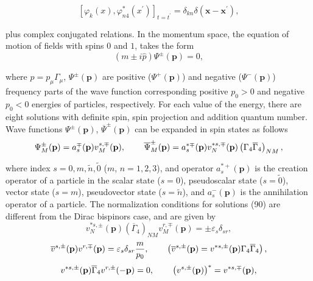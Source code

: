 \documentclass[a4paper,12pt]{article}
\begin{document}
\[
\left[ \varphi _k(x),\varphi _{n4}^{*}(x^{\prime })\right]
_{t=t^{\prime }}=\delta _{kn}\delta (\mathbf{x}-\mathbf{x}^{\prime
}) ,
\]

plus complex conjugated relations. In the momentum space, the equation of
motion of fields with spins $0$ and $1$, takes the form
\begin{equation}
\left( m\pm i\widehat{p}\right) \Psi ^{\pm }(\mathbf{p})=0
,\label{89}
\end{equation}

where $\widehat{p}=p_\mu \Gamma _\mu $, $\Psi ^{\pm }(\mathbf{p})$
are positive ($\Psi ^{+}(\mathbf{p})$) and negative ($\Psi
^{-}(\mathbf{p})$) frequency parts of the wave function
corresponding positive $p_0>0$ and negative $p_0<0$ energies of
particles, respectively. For each value of the energy, there are
eight solutions with definite spin, spin projection and addition
quantum number. Wave functions $\Psi ^{\pm }(\mathbf{p})$, $
\overline{\Psi }^{\pm }(\mathbf{p})$ can be expanded in spin
states as follows
\begin{equation}
\Psi _M^{\pm }(\mathbf{p})=a_s^{\mp }(\mathbf{p})v_M^{s,\mp
}(\mathbf{p}) ,\hspace{0.3in}\overline{\Psi }_M^{\pm
}(\mathbf{p})=a_s^{*\mp }(\mathbf{p} )v_N^{*s,\mp
}(\mathbf{p})\left( \Gamma _4\overline{\Gamma }_4\right) _{NM} ,
\label{90}
\end{equation}

where index $s=0,m,\widetilde{n},\widetilde{0}$ ($m$, $n=1,2,3$),
and operator $a_s^{*+}(\mathbf{p})$ is the creation operator of a
particle in the scalar state ($s=0$), pseudoscalar state
($s=\widetilde{0}$), vector state ($s=m$), pseudovector state
($s=\widetilde{n}$), and $a_s^{-}(\mathbf{p })$ is the
annihilation operator of a particle. The normalization conditions
for solutions (90) are different from the Dirac bispinors case,
and are given by
\begin{equation}
v_N^{*s,\pm }(\mathbf{p})\left( \overline{\Gamma }_4\right)
_{NM}v_M^{r,\mp }(\mathbf{p})=\pm \varepsilon _s\delta _{sr} ,
\label{91}
\end{equation}
\begin{equation}
\overline{v}^{s,\pm }(\mathbf{p})v^{r,\mp
}(\mathbf{p})=\varepsilon _s\delta _{sr}\frac m{p_0} ,
\hspace{0.3in}\left( \overline{v}^{s,\pm }(\mathbf{p} )=v^{*s,\pm
}(\mathbf{p})\Gamma _4\overline{\Gamma }_4\right) ,\label{92}
\end{equation}
\begin{equation}
v^{*s,\pm }(\mathbf{p})\overline{\Gamma }_4v^{r,\pm
}(-\mathbf{p})=0 ,\hspace{0.3in}\left( v^{s,\pm
}(\mathbf{p})\right) ^{*}=v^{*s,\mp }(\mathbf{p }) , \label{93}
\end{equation}
\end{document}
